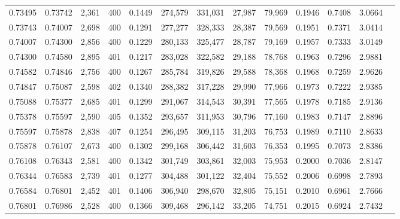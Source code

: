 \begin{tabular}{rrrrrrrrrrrrr}
0.73495 & 0.73742 & 2,361 & 400 &                                     0.1449 & 274,579 & 331,031 &  27,987 &  79,969 & 0.1946 & 0.7408 & 3.0664 \\
0.73743 & 0.74007 & 2,698 & 400 &                                     0.1291 & 277,277 & 328,333 &  28,387 &  79,569 & 0.1951 & 0.7371 & 3.0414 \\
0.74007 & 0.74300 & 2,856 & 400 &                                     0.1229 & 280,133 & 325,477 &  28,787 &  79,169 & 0.1957 & 0.7333 & 3.0149 \\
0.74300 & 0.74580 & 2,895 & 401 &                                     0.1217 & 283,028 & 322,582 &  29,188 &  78,768 & 0.1963 & 0.7296 & 2.9881 \\
0.74582 & 0.74846 & 2,756 & 400 &                                     0.1267 & 285,784 & 319,826 &  29,588 &  78,368 & 0.1968 & 0.7259 & 2.9626 \\
0.74847 & 0.75087 & 2,598 & 402 &                                     0.1340 & 288,382 & 317,228 &  29,990 &  77,966 & 0.1973 & 0.7222 & 2.9385 \\
0.75088 & 0.75377 & 2,685 & 401 &                                     0.1299 & 291,067 & 314,543 &  30,391 &  77,565 & 0.1978 & 0.7185 & 2.9136 \\
0.75378 & 0.75597 & 2,590 & 405 &                                     0.1352 & 293,657 & 311,953 &  30,796 &  77,160 & 0.1983 & 0.7147 & 2.8896 \\
0.75597 & 0.75878 & 2,838 & 407 &                                     0.1254 & 296,495 & 309,115 &  31,203 &  76,753 & 0.1989 & 0.7110 & 2.8633 \\
0.75878 & 0.76107 & 2,673 & 400 &                                     0.1302 & 299,168 & 306,442 &  31,603 &  76,353 & 0.1995 & 0.7073 & 2.8386 \\
0.76108 & 0.76343 & 2,581 & 400 &                                     0.1342 & 301,749 & 303,861 &  32,003 &  75,953 & 0.2000 & 0.7036 & 2.8147 \\
0.76344 & 0.76583 & 2,739 & 401 &                                     0.1277 & 304,488 & 301,122 &  32,404 &  75,552 & 0.2006 & 0.6998 & 2.7893 \\
0.76584 & 0.76801 & 2,452 & 401 &                                     0.1406 & 306,940 & 298,670 &  32,805 &  75,151 & 0.2010 & 0.6961 & 2.7666 \\
0.76801 & 0.76986 & 2,528 & 400 &                                     0.1366 & 309,468 & 296,142 &  33,205 &  74,751 & 0.2015 & 0.6924 & 2.7432 \\

\end{tabular}
